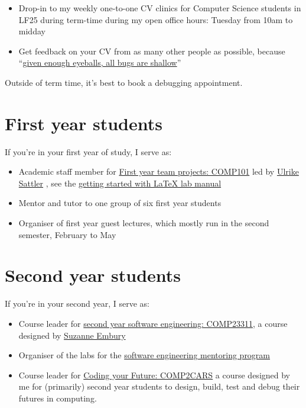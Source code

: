 \documentclass[
  12pt,
]{book}
\providecommand{\tightlist}{%
  \setlength{\itemsep}{0pt}\setlength{\parskip}{0pt}}
\begin{document}
\begin{itemize}
\tightlist
\item
  Drop-in to my weekly one-to-one CV clinics for Computer Science students in LF25 during term-time during my open office hours: Tuesday from 10am to midday
\item
  Get feedback on your CV from as many other people as possible, because ``\href{https://en.wikipedia.org/wiki/Linus\%27s_law}{given enough eyeballs, all bugs are shallow}'' \citep{Raymond1999}
\end{itemize}

Outside of term time, it's best to book a debugging appointment. 🐛

\hypertarget{year1}{%
\section{First year students}\label{year1}}

If you're in your first year of study, I serve as:

\begin{itemize}
\tightlist
\item
  Academic staff member for \href{https://studentnet.cs.manchester.ac.uk/ugt/COMP10120/syllabus/}{First year team projects: COMP101} led by \href{http://www.cs.man.ac.uk/~sattler/}{Ulrike Sattler} \citep{COMP10120}, see the \href{http://latex4year1.netlify.app}{getting started with LaTeX lab manual}
\item
  Mentor and tutor to one group of six first year students
\item
  Organiser of first year guest lectures, which mostly run in the second semester, February to May
\end{itemize}

\hypertarget{year2}{%
\section{Second year students}\label{year2}}

If you're in your second year, I serve as:

\begin{itemize}
\tightlist
\item
  Course leader for \href{https://studentnet.cs.manchester.ac.uk/ugt/COMP23311/syllabus/}{second year software engineering: COMP23311}, a course designed by \href{http://www.cs.man.ac.uk/~embury/}{Suzanne Embury} \citep{COMP23311, git}
\item
  Organiser of the labs for the \href{https://www.cs.manchester.ac.uk/connect/business-engagement/industrial-mentoring/}{software engineering mentoring program}
\item
  Course leader for \href{https://www.cdyf.me/}{Coding your Future: COMP2CARS} a course designed by me for (primarily) second year students to design, build, test and debug their futures in computing.
\end{itemize}
\end{document}
